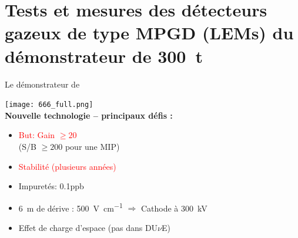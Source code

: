     \section[Tests des LEMs]{Tests et mesures des détecteurs gazeux de type MPGD (LEMs) du démonstrateur de \SI{300}{\tonne}}

    {
        \begin{specialframe}
            \vspace{2cm}\hspace*{-1.8cm}\parbox[t]{\textwidth}{
                \begin{center}
                    \begin{Huge}
                            \textcolor{pheniics_purple}{\textbf{\insertsection}}
                    \end{Huge}
                \end{center}
            }
        \end{specialframe}
    }

    \begin{frame}{Le démonstrateur de \SSS{}}
    	\begin{scriptsize}
                \centering
    			\texttt{[image: 666\_full.png]}\\
    			\vfill
    			\textbf{Nouvelle technologie -- principaux défis :}\\
    			\begin{minipage}{0.32\textwidth}
    				\begin{itemize}
    					\item \textcolor{red}{But: Gain $\geq 20$} \\(S/B $\geq 200$ pour une MIP)
    					\item \textcolor{red}{Stabilité (plusieurs années)}
    				\end{itemize}
    			\end{minipage}\hfill
    			\begin{minipage}{0.32\textwidth}
    				\begin{itemize}
    					\item Impuretés: 0.1\;ppb
    					\item \SI{6}{\meter} de dérive : \SI{500}{\volt\per\centi\meter} $\Rightarrow$ Cathode à \SI{300}{\kilo\volt}
    				\end{itemize}
	    		\end{minipage}\hfill
	    		\begin{minipage}{0.32\textwidth}
	    			\begin{itemize}
    					\item[\danger] Effet de charge d'espace (pas dans DU$\nu$E)
	    			\end{itemize}
	    		\end{minipage}
    	\end{scriptsize} 
    \end{frame}
    
